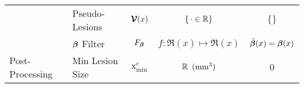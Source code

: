 \begin{table}
\begin{tabular}{llccc}
  	                                 & Pseudo-Lesions       &         $\bm{\mathcal{V}}(x)$          &    $\{\thinspace\cdot\in\mathbb{R}\}$    &          $\{\}$           \\
  	                                 & $\bm{\beta}$ Filter         &         $F_{\bm{\beta}}$         & $f: \Re(x) \mapsto \Re(x)$ & $\tilde{\bm{\beta}}(x) = \bm{\beta}(x)$ \\ \hline
  	\multirow{1}{*}{Post-Processing} & Min Lesion  Size     &  $\mathrm{x}_{\min}^{c}$  &  $\mathbb{R}\enspace(\text{mm}^{3})$   &            $0$            \\ \hline
  \end{tabular}
\end{table}
